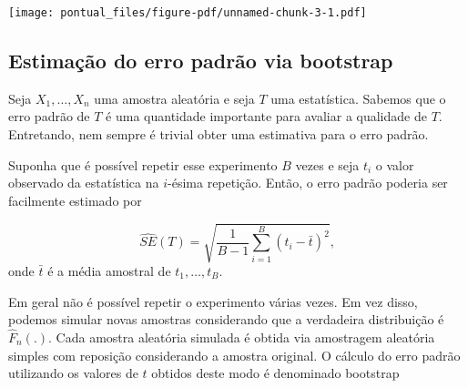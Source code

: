 \documentclass[
  letterpaper,
  DIV=11,
  numbers=noendperiod]{scrartcl}
\newenvironment{Shaded}{\begin{snugshade}}{\end{snugshade}}
\newcommand{\AttributeTok}[1]{\textcolor[rgb]{0.40,0.45,0.13}{#1}}
\newcommand{\ControlFlowTok}[1]{\textcolor[rgb]{0.00,0.23,0.31}{\textbf{#1}}}
\newcommand{\DecValTok}[1]{\textcolor[rgb]{0.68,0.00,0.00}{#1}}
\newcommand{\FunctionTok}[1]{\textcolor[rgb]{0.28,0.35,0.67}{#1}}
\newcommand{\NormalTok}[1]{\textcolor[rgb]{0.00,0.23,0.31}{#1}}
\newcommand{\OtherTok}[1]{\textcolor[rgb]{0.00,0.23,0.31}{#1}}
\newcommand{\SpecialCharTok}[1]{\textcolor[rgb]{0.37,0.37,0.37}{#1}}
\newcommand{\StringTok}[1]{\textcolor[rgb]{0.13,0.47,0.30}{#1}}
\begin{document}
\begin{Shaded}
\end{Shaded}

\texttt{[image: pontual\_files/figure-pdf/unnamed-chunk-3-1.pdf]}

\subsection{Estimação do erro padrão via
bootstrap}\label{estimauxe7uxe3o-do-erro-padruxe3o-via-bootstrap}

Seja \(X_1,\ldots,X_n\) uma amostra aleatória e seja \(T\) uma
estatística. Sabemos que o erro padrão de \(T\) é uma quantidade
importante para avaliar a qualidade de \(T\). Entretando, nem sempre é
trivial obter uma estimativa para o erro padrão.

Suponha que é possível repetir esse experimento \(B\) vezes e seja
\(t_i\) o valor observado da estatística na \(i\)-ésima repetição.
Então, o erro padrão poderia ser facilmente estimado por

\[\widehat{SE}(T)=\sqrt{\frac{1}{B-1}\sum_{i=1}^B(t_i-\bar{t})^2},\]
onde \(\bar{t}\) é a média amostral de \(t_1,\ldots,t_B\).

Em geral não é possível repetir o experimento várias vezes. Em vez
disso, podemos simular novas amostras considerando que a verdadeira
distribuição é \(\hat{F}_n(.)\). Cada amostra aleatória simulada é
obtida via amostragem aleatória simples com reposição considerando a
amostra original. O cálculo do erro padrão utilizando os valores de
\(t\) obtidos deste modo é denominado bootstrap
\end{document}
